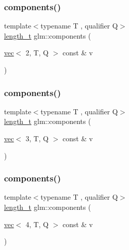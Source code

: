 \subsubsection{\texorpdfstring{components()}{components()}\hspace{0.1cm}{\footnotesize\ttfamily [2/5]}}
{\footnotesize\ttfamily template$<$typename T , qualifier Q$>$ \\
\hyperlink{namespaceglm_a090a0de2260835bee80e71a702492ed9}{length\+\_\+t} glm\+::components (\begin{DoxyParamCaption}\item[{\hyperlink{structglm_1_1vec}{vec}$<$ 2, T, Q $>$ const \&}]{v }\end{DoxyParamCaption})\hspace{0.3cm}{\ttfamily [inline]}}

\mbox{\label{group__gtx__range_gae7c3451f88f2550ed896da642cdbfd2d}} 
\subsubsection{\texorpdfstring{components()}{components()}\hspace{0.1cm}{\footnotesize\ttfamily [3/5]}}
{\footnotesize\ttfamily template$<$typename T , qualifier Q$>$ \\
\hyperlink{namespaceglm_a090a0de2260835bee80e71a702492ed9}{length\+\_\+t} glm\+::components (\begin{DoxyParamCaption}\item[{\hyperlink{structglm_1_1vec}{vec}$<$ 3, T, Q $>$ const \&}]{v }\end{DoxyParamCaption})\hspace{0.3cm}{\ttfamily [inline]}}

\mbox{\label{group__gtx__range_ga6a306e940263c39ce05d378f68a7caff}} 
\subsubsection{\texorpdfstring{components()}{components()}\hspace{0.1cm}{\footnotesize\ttfamily [4/5]}}
{\footnotesize\ttfamily template$<$typename T , qualifier Q$>$ \\
\hyperlink{namespaceglm_a090a0de2260835bee80e71a702492ed9}{length\+\_\+t} glm\+::components (\begin{DoxyParamCaption}\item[{\hyperlink{structglm_1_1vec}{vec}$<$ 4, T, Q $>$ const \&}]{v }\end{DoxyParamCaption})\hspace{0.3cm}{\ttfamily [inline]}}

